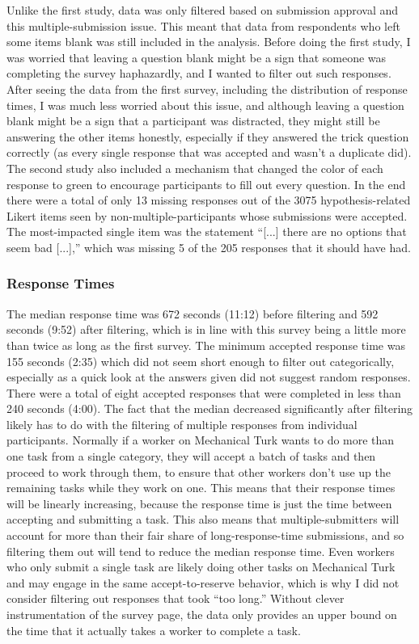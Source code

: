 Unlike the first study, data was only filtered based on submission approval and this multiple-submission issue.
%
This meant that data from respondents who left some items blank was still included in the analysis.
%
Before doing the first study, I was worried that leaving a question blank might be a sign that someone was completing the survey haphazardly, and I wanted to filter out such responses.
%
After seeing the data from the first survey, including the distribution of response times, I was much less worried about this issue, and although leaving a question blank might be a sign that a participant was distracted, they might still be answering the other items honestly, especially if they answered the trick question correctly (as every single response that was accepted and wasn't a duplicate did).
%
The second study also included a mechanism that changed the color of each response to green to encourage participants to fill out every question.
%
In the end there were a total of only 13 missing responses out of the 3075 hypothesis-related Likert items seen by non-multiple-participants whose submissions were accepted.
%
The most-impacted single item was the statement ``[...] there are no options that seem bad [...],'' which was missing 5 of the 205 responses that it should have had.


\subsubsection{Response Times}

The median response time was 672 seconds (11:12) before filtering and 592 seconds (9:52) after filtering, which is in line with this survey being a little more than twice as long as the first survey.
%
The minimum accepted response time was 155 seconds (2:35) which did not seem short enough to filter out categorically, especially as a quick look at the answers given did not suggest random responses.
%
There were a total of eight accepted responses that were completed in less than 240 seconds (4:00).
%
The fact that the median decreased significantly after filtering likely has to do with the filtering of multiple responses from individual participants.
%
Normally if a worker on Mechanical Turk wants to do more than one task from a single category, they will accept a batch of tasks and then proceed to work through them, to ensure that other workers don't use up the remaining tasks while they work on one.
%
This means that their response times will be linearly increasing, because the response time is just the time between accepting and submitting a task.
%
This also means that multiple-submitters will account for more than their fair share of long-response-time submissions, and so filtering them out will tend to reduce the median response time.
%
Even workers who only submit a single task are likely doing other tasks on Mechanical Turk and may engage in the same accept-to-reserve behavior, which is why I did not consider filtering out responses that took ``too long.''
%
Without clever instrumentation of the survey page, the data only provides an upper bound on the time that it actually takes a worker to complete a task.


